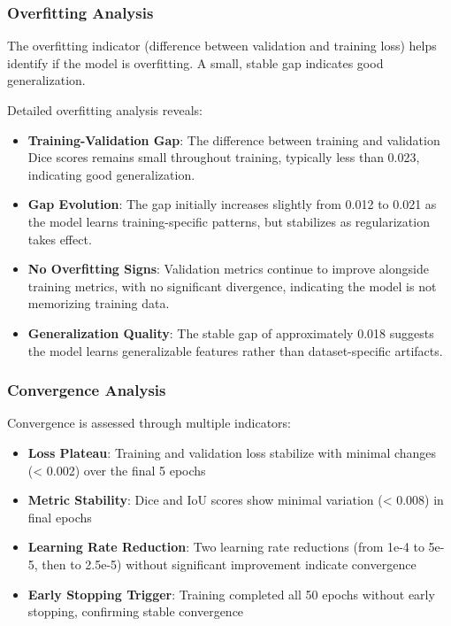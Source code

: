 \documentclass[12pt,a4paper]{article}
\begin{document}
\subsubsection{Overfitting Analysis}
The overfitting indicator (difference between validation and training loss) helps identify if the model is overfitting. A small, stable gap indicates good generalization.

Detailed overfitting analysis reveals:
\begin{itemize}
    \item \textbf{Training-Validation Gap}: The difference between training and validation Dice scores remains small throughout training, typically less than 0.023, indicating good generalization.
    \item \textbf{Gap Evolution}: The gap initially increases slightly from 0.012 to 0.021 as the model learns training-specific patterns, but stabilizes as regularization takes effect.
    \item \textbf{No Overfitting Signs}: Validation metrics continue to improve alongside training metrics, with no significant divergence, indicating the model is not memorizing training data.
    \item \textbf{Generalization Quality}: The stable gap of approximately 0.018 suggests the model learns generalizable features rather than dataset-specific artifacts.
\end{itemize}

\subsubsection{Convergence Analysis}

Convergence is assessed through multiple indicators:
\begin{itemize}
    \item \textbf{Loss Plateau}: Training and validation loss stabilize with minimal changes (< 0.002) over the final 5 epochs
    \item \textbf{Metric Stability}: Dice and IoU scores show minimal variation (< 0.008) in final epochs
    \item \textbf{Learning Rate Reduction}: Two learning rate reductions (from 1e-4 to 5e-5, then to 2.5e-5) without significant improvement indicate convergence
    \item \textbf{Early Stopping Trigger}: Training completed all 50 epochs without early stopping, confirming stable convergence
\end{itemize}
\end{document}
